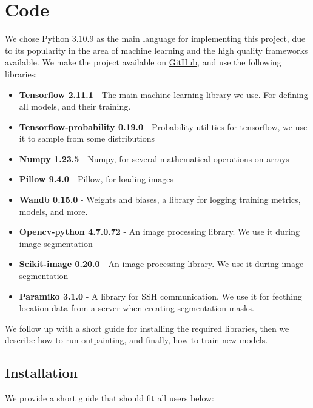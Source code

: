 \chapter{Code}

We chose Python 3.10.9 as the main language for implementing this project, due to its popularity in the area of machine learning and the high quality frameworks available. We make the project available on \href{https://github.com/Matezzzz/Image_outpainting}{GitHub}, and use the following libraries:

\begin{itemize}
    \item \textbf{Tensorflow 2.11.1} \citep{tensorflow} - The main machine learning library we use. For defining all models, and their training.
    \item \textbf{Tensorflow-probability 0.19.0} \citep{tensorflow_probability} - Probability utilities for tensorflow, we use it to sample from some distributions
    \item \textbf{Numpy 1.23.5} \citep{numpy} - Numpy, for several mathematical operations on arrays
    \item \textbf{Pillow 9.4.0} \citep{pillow} - Pillow, for loading images
    \item \textbf{Wandb 0.15.0} \citep{wandb} - Weights and biases, a library for logging training metrics, models, and more.
    \item \textbf{Opencv-python 4.7.0.72} \citep{opencv_python} - An image processing library. We use it during image segmentation
    \item \textbf{Scikit-image 0.20.0} \citep{scikit_image} - An image processing library. We use it during image segmentation
    \item \textbf{Paramiko 3.1.0} \citep{paramiko} - A library for SSH communication. We use it for fecthing location data from a server when creating segmentation masks.
\end{itemize}


We follow up with a short guide for installing the required libraries, then we describe how to run outpainting, and finally, how to train new models.

\section{Installation}

We provide a short guide that should fit all users below:

